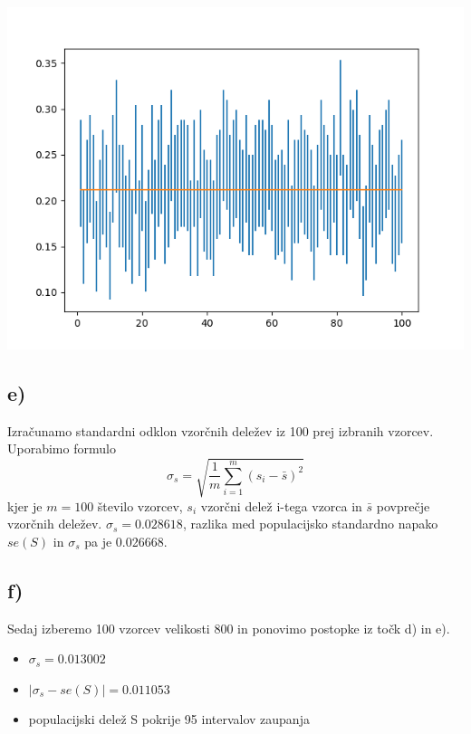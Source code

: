 \documentclass[A4paper, 11pt]{article}
\begin{document}
\includegraphics[scale=0.8]{Kibergrad_1}

\subsection*{e)}
Izračunamo standardni odklon vzorčnih deležev  iz 100 prej izbranih vzorcev. Uporabimo formulo
\[ \sigma_s = \sqrt{\frac{1}{m} \sum_{i=1}^{m} (s_i - \bar{s})^2} \] 
kjer je $m=100$ število vzorcev, $s_i$ vzorčni delež i-tega vzorca in $\bar{s}$ povprečje vzorčnih deležev. 
$\sigma_s = 0.028618$, razlika med populacijsko standardno napako $se(S)$ in $\sigma_s$ pa je 0.026668. 

\newpage

\subsection*{f)}
Sedaj izberemo 100 vzorcev velikosti 800 in ponovimo postopke iz točk d) in e).
\begin{itemize}
\item $\sigma_s = 0.013002$
\item $| \sigma_s - se(S) | = 0.011053$
\item populacijski delež S pokrije 95 intervalov zaupanja
\end{itemize}
\end{document}
